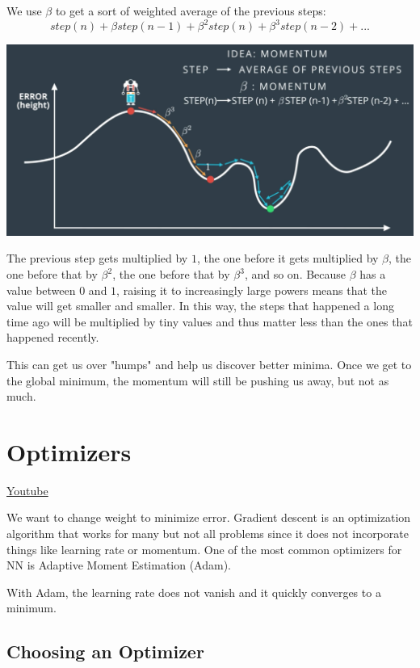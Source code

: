 We use \(\beta\) to get a sort of weighted average of the previous steps: \[{step}(n) + \beta {step}(n - 1) + \beta^2{step}(n) + \beta^3{step}(n - 2) + ...\]

\includegraphics[width=1\linewidth]{img//intro//trainingNN/image4.png}

The previous step gets multiplied by \(1\), the one before it gets multiplied by \(\beta\), the one before that by \(\beta^2\), the one before that by \(\beta^3\), and so on. Because \(\beta\) has a value between \(0\) and \(1\), raising it to increasingly large powers means that the value will get smaller and smaller. In this way, the steps that happened a long time ago will be multiplied by tiny values and thus matter less than the ones that happened recently.\newline

This can get us over "humps" and help us discover better minima. Once we get to the global minimum, the momentum will still be pushing us away, but not as much.


\section{Optimizers}
\href{https://www.youtube.com/watch?v=4Ocl-2lwO6U&t=1s&ab_channel=Udacity}{Youtube} \newline

We want to change weight to minimize error. Gradient descent is an optimization algorithm that works for many but not all problems since it does not incorporate things like learning rate or momentum. One of the most common optimizers for NN is Adaptive Moment Estimation (Adam).  \newline

With Adam, the learning rate does not vanish and it quickly converges to a minimum.  

\subsection{Choosing an Optimizer}

